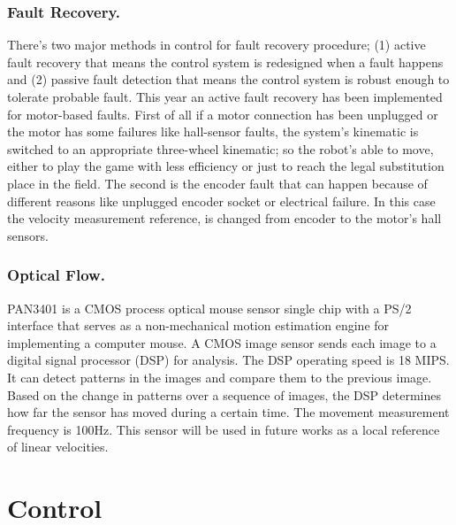 \documentclass{llncs}
\begin{document}
\subsubsection{Fault Recovery.}
\label{subsubsec:FaultRecovery}
There’s two major methods in control for fault recovery procedure; (1) active fault recovery that means the control system is redesigned when a fault happens and (2) passive fault detection that means the control system is robust enough to tolerate probable fault.
\newline This year an active fault recovery has been implemented for motor-based faults. First of all if a motor connection has been unplugged or the motor has some failures like hall-sensor faults, the system’s kinematic is switched to an appropriate three-wheel kinematic; so the robot’s able to move, either to play the game with less efficiency or just to reach the legal substitution place in the field. 
\newline The second is the encoder fault that can happen because of different reasons like unplugged encoder socket or electrical failure. In this case the velocity measurement reference, is changed from encoder to the motor’s hall sensors.
\subsubsection{Optical Flow.}
\label{subsubsec:OpticalFlow}
PAN3401 is a CMOS process optical mouse sensor single chip with a PS/2 interface that serves as a non-mechanical motion estimation engine for implementing a computer mouse.
A CMOS image sensor sends each image to a digital signal processor (DSP) for analysis. The DSP operating speed is 18 MIPS. It can detect patterns in the images and compare them to the previous image. Based on the change in patterns over a sequence of images, the DSP determines how far the sensor has moved during a certain time. The movement measurement frequency is 100Hz.
This sensor will be used in future works as a local reference of linear velocities.

\section{Control}
%
\end{document}
